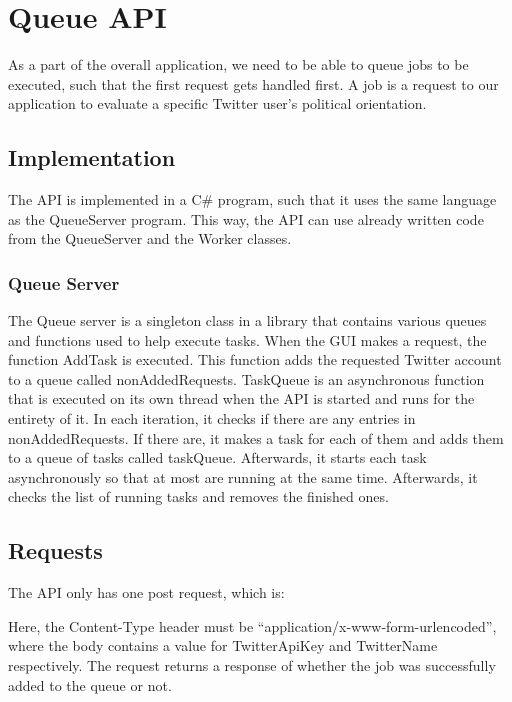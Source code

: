 \chapter{Queue \ac{API}}
As a part of the overall application, we need to be able to queue jobs to be
executed, such that the first request gets handled first. A job is a request to
our application to evaluate a specific Twitter user's political orientation.

\section{Implementation}
The \ac{API} is implemented in a C\# program, such that it uses the same
language as the QueueServer program. This way, the \ac{API} can use already
written code from the QueueServer and the Worker classes.

\subsection{Queue Server}
The Queue server is a singleton class in a library that contains various
queues and functions used to help execute tasks. When the GUI makes a request,
the function AddTask is executed. This function adds the requested Twitter
account to a queue called nonAddedRequests. TaskQueue is an asynchronous
function that is executed on its own thread when the \ac{API} is started and runs for
the entirety of it. In each iteration, it checks if there are any entries in
nonAddedRequests. If there are, it makes a task for each of them and adds them
to a queue of tasks called taskQueue. Afterwards, it starts each task
asynchronously so that at most 
are running at the same time. Afterwards, it checks the list of
running tasks and removes the finished ones.


\section{Requests}
The \ac{API} only has one post request, which is: \nl

\nl

Here, the Content-Type header must be ``application/x-www-form-urlencoded'',
where the body contains a value for TwitterApiKey and TwitterName
respectively.
The request returns a response of whether the job was successfully added to the
queue or not.



